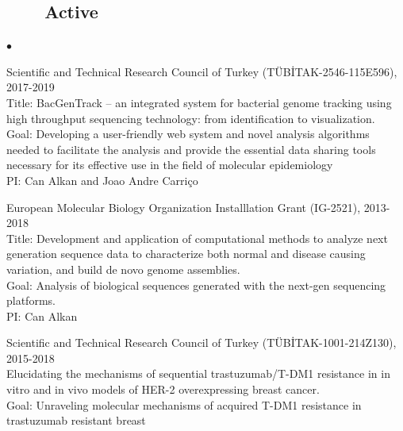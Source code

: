 \documentclass[margin,line]{res}
\newenvironment{list2}{
  \begin{list}{$\bullet$}{%
      \setlength{\itemsep}{0in}
      \setlength{\parsep}{0in} \setlength{\parskip}{0in}
      \setlength{\topsep}{0in} \setlength{\partopsep}{0in} 
      \setlength{\leftmargin}{0.2in}}}{\end{list}}
\begin{document}
\begin{resume}
                                       \subsection{\small \sc ~~~~Active}

                                       \begin{list2}
                                       \item
                                         Scientific and Technical Research Council of Turkey (T\"{U}B\.{I}TAK-2546-115E596), 2017-2019\\
                                         Title: BacGenTrack – an integrated system for bacterial genome tracking using high throughput sequencing technology: from identification to visualization.\\
                                         Goal: Developing a user-friendly web system and novel analysis algorithms needed to facilitate the analysis and provide
                                         the essential data sharing tools necessary for its effective use in the field of molecular epidemiology\\
                                         PI: Can Alkan and Joao Andre Carriço
                                       \item
                                         European Molecular Biology Organization Installlation Grant (IG-2521), 2013-2018 \\
                                         Title: Development and application of computational methods to analyze next generation sequence data to characterize both normal and disease causing variation, and build de novo genome assemblies.\\
                                         Goal: Analysis of biological sequences generated with the next-gen sequencing platforms.\\
                                         PI: Can Alkan
                                       \item
                                         Scientific and Technical Research Council of Turkey (T\"{U}B\.{I}TAK-1001-214Z130), 2015-2018\\
                                         Elucidating the mechanisms of sequential trastuzumab/T-DM1 resistance in in vitro and in vivo models of HER-2
                                         overexpressing breast cancer.\\
                                         Goal: Unraveling molecular mechanisms of acquired T-DM1 resistance in trastuzumab resistant breast 

\end{list2}
\end{resume}
\end{document}
